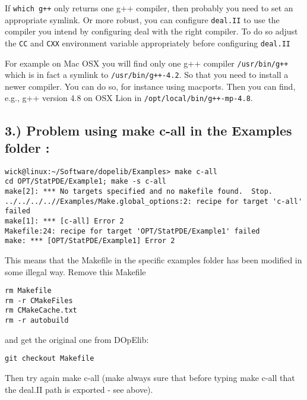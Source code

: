   If \texttt{which g++} only returns one g++ compiler, then probably you need to
  set an appropriate symlink. Or more robust, you can configure \texttt{deal.II}
  to use the compiler you intend by configuring deal with the right compiler. To
  do so adjust  the \texttt{CC} and \texttt{CXX} environment variable appropriately
  before configuring \texttt{deal.II}
  
  For example on Mac OSX you will find only one g++ compiler \texttt{/usr/bin/g++}
  which is in fact a symlink to \texttt{/usr/bin/g++-4.2}. 
  So that you need to install a newer compiler. You can do so, for instance
  using macports. Then you can find, e.g., g++ version 4.8 on OSX Lion 
  in \texttt{/opt/local/bin/g++-mp-4.8}. 


\subsection*{3.) Problem using make c-all in the Examples folder :}

\begin{lstlisting}
wick@linux:~/Software/dopelib/Examples> make c-all
cd OPT/StatPDE/Example1; make -s c-all
make[2]: *** No targets specified and no makefile found.  Stop.
../../../..//Examples/Make.global_options:2: recipe for target 'c-all' failed
make[1]: *** [c-all] Error 2
Makefile:24: recipe for target 'OPT/StatPDE/Example1' failed
make: *** [OPT/StatPDE/Example1] Error 2
\end{lstlisting}

This means that the Makefile in the specific examples folder has been 
modified in some illegal way. Remove this Makefile 
\begin{lstlisting}
rm Makefile
rm -r CMakeFiles
rm CMakeCache.txt
rm -r autobuild
\end{lstlisting}
and get the original 
one from DOpElib:
\begin{lstlisting}
git checkout Makefile
\end{lstlisting}
Then try again make c-all (make always sure that before 
typing make c-all that the deal.II path is exported - see above). 

